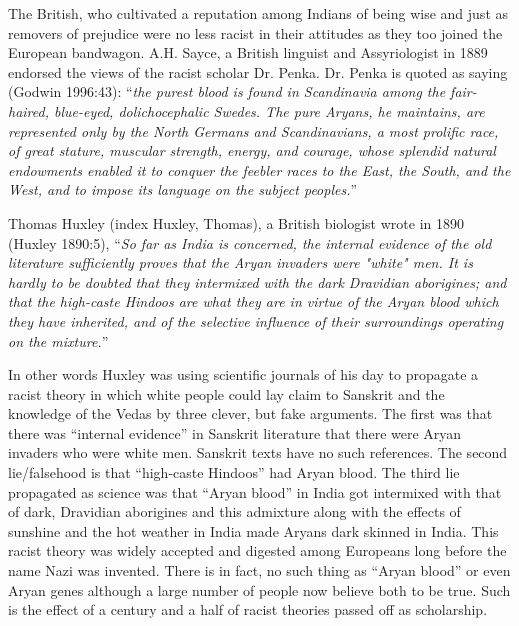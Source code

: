 The British, who cultivated a reputation among Indians of being wise and just as removers of prejudice were no less racist in their attitudes as they too joined the European bandwagon. A.H. Sayce, a British linguist and Assyriologist in 1889 endorsed the views of the racist scholar Dr. Penka. Dr. Penka is quoted as saying (Godwin 1996:43): “\textit{the purest blood is found in Scandinavia among the fair-haired, blue-eyed, dolichocephalic Swedes. The pure Aryans, he maintains, are represented only by the North Germans and Scandinavians, a most prolific race, of great stature, muscular strength, energy, and courage, whose splendid natural endowments enabled it to conquer the feebler races to the East, the South, and the West, and to impose its language on the subject peoples.}”

Thomas Huxley (index Huxley, Thomas), a British biologist wrote in 1890 (Huxley 1890:5), “\textit{So far as India is concerned, the internal evidence of the old literature sufficiently proves that the Aryan invaders were "white" men. It is hardly to be doubted that they intermixed with the dark Dravidian aborigines; and that the high-caste Hindoos are what they are in virtue of the Aryan blood which they have inherited, and of the selective influence of their surroundings operating on the mixture.}”

In other words Huxley was using scientific journals of his day to propagate a racist theory in which white people could lay claim to Sanskrit and the knowledge of the Vedas by three clever, but fake arguments. The first was that there was “internal evidence” in Sanskrit literature that there were Aryan invaders who were white men. Sanskrit texts have no such references. The second lie/falsehood is that “high-caste Hindoos” had Aryan blood. The third lie propagated as science was that “Aryan blood” in India got intermixed with that of dark, Dravidian aborigines and this admixture along with the effects of sunshine and the hot weather in India made Aryans dark skinned in India. This racist theory was widely accepted and digested among Europeans long before the name Nazi was invented. There is in fact, no such thing as “Aryan blood” or even Aryan genes although a large number of people now believe both to be true. Such is the effect of a century and a half of racist theories passed off as scholarship.

